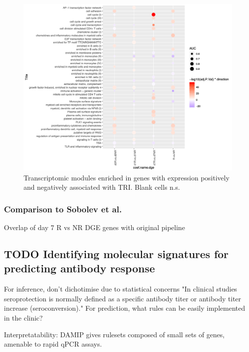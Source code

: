 \begin{figure}
    \includegraphics[width=1.0\textwidth,page=2]{mainmatter/figures/chapter_02/compare_dge_eqtl.tmodDotPlot.DGE.png}
    \caption{Transcriptomic modules enriched in genes with expression positively and negatively associated with TRI. Blank cells n.s.}
    \label{tab:tri_tmod}
\end{figure}

\subsubsection{Comparison to Sobolev et al.}

Overlap of day 7 R vs NR DGE genes with original pipeline

\subsection{TODO Identifying molecular signatures for predicting antibody response}

\begin{outline}

\1 For inference, don't dichotimise due to statistical concerns
    \2 "In clinical studies seroprotection is normally defined as a specific antibody titer or antibody titer increase (seroconversion)."
    \2 For prediction, what rules can be easily implemented in the clinic?

\1 Interpretatability: DAMIP gives rulesets composed of small sets of genes, amenable to rapid qPCR assays.

\end{outline}

